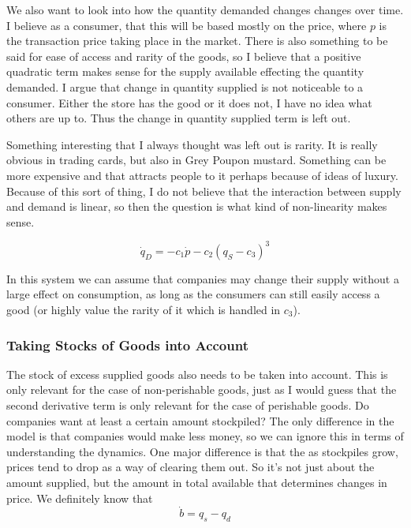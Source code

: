 \documentclass{article}
\begin{document}
We also want to look into how the quantity demanded changes changes over time. I believe as a consumer, that this will be based mostly on the price, where $p$ is the transaction price taking place in the market. There is also something to be said for ease of access and rarity of the goods, so I believe that a positive quadratic term makes sense for the supply available effecting the quantity demanded. I argue that change in quantity supplied is not noticeable to a consumer. Either the store has the good or it does not, I have no idea what others are up to. Thus the change in quantity supplied term is left out. 

Something interesting that I always thought was left out is rarity. It is really obvious in trading cards, but also in Grey Poupon mustard. Something can be more expensive and that attracts people to it perhaps because of ideas of luxury. Because of this sort of thing, I do not believe that the interaction between supply and demand is linear, so then the question is what kind of non-linearity makes sense. 

\begin{equation}
		\dot{q}_D = - c_1 \dot{p} - c_2(q_S-c_3)^3
\end{equation}

In this system we can assume that companies may change their supply without a large effect on consumption, as long as the consumers can still easily access a good (or highly value the rarity of it which is handled in $c_3$).

\subsubsection{Taking Stocks of Goods into Account}
The stock of excess supplied goods also needs to be taken into account. This is only relevant for the case of non-perishable goods, just as I would guess that the second derivative term is only relevant for the case of perishable goods. Do companies want at least a certain amount stockpiled? The only difference in the model is that companies would make less money, so we can ignore this in terms of understanding the dynamics. One major difference is that the as stockpiles grow, prices tend to drop as a way of clearing them out. So it's not just about the amount supplied, but the amount in total available that determines changes in price. We definitely know that 
\begin{equation*}
	\dot{b} = q_s - q_d
\end{equation*}
\end{document}
